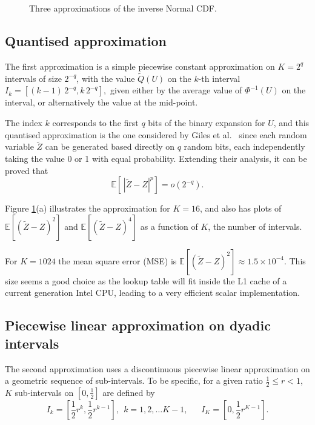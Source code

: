 \documentclass[11pt]{article}
\def \EE {{\mathbb{E}}}
\def \tQ {{\widetilde{Q}}}
\def \tZ {{\widetilde{Z}}}
\newcommand{\fracs}[2]{{\textstyle \frac{#1}{#2}}}
\begin{document}
\begin{figure}
\begin{center}
 \\
 \\
\end{center}
\caption{Three approximations of the inverse Normal CDF.}
\label{fig:fig1}
\end{figure}

\subsection{Quantised approximation}

The first approximation is a simple piecewise constant approximation on
$K\!=\!2^q$ intervals of size $2^{-q}$, with the value $\tQ(U)$ on the
$k$-th interval
$\displaystyle
I_k = [(k{-}1)\, 2^{-q}, k\, 2^{-q}],
$
given either by the average value of $\Phi^{-1}(U)$ on the interval, or 
alternatively the value at the mid-point.

The index $k$ corresponds to the first $q$ bits of the binary expansion 
for $U$, and this quantised approximation is the one considered by 
Giles et al.~\cite{ghmr19,ghmr19b}
since each random variable $\tZ$ can be generated based directly on 
$q$ random bits, each independently taking the value 0 or 1 with equal 
probability.  Extending their analysis, it can be proved that
\[
\EE[\, |\tZ{-}Z|^p] = o(2^{-q} ).
\]

Figure \ref{fig:fig1}(a) illustrates the approximation for $K\!=\!16$, 
and also has plots of $\EE[(\tZ{-}Z)^2]$ and $\EE[(\tZ{-}Z)^4]$ 
as a function of $K$, the number of intervals.

For $K\!=\!1024$ the mean square error (MSE) is
$\EE[(\tZ{-}Z)^2] \!\approx\! 1.5\!\times\! 10^{-4}$.
This size seems a good choice as the lookup table will fit inside the L1 
cache of a current generation Intel CPU, leading to a very efficient scalar 
implementation.

\subsection{Piecewise linear approximation on dyadic intervals}

The second approximation uses a discontinuous piecewise linear approximation
on a geometric sequence of sub-intervals.  To be specific, for a given ratio 
$\fracs{1}{2}\leq r < 1$, $K$ sub-intervals on $[0,\fracs{1}{2}]$ are defined by
\[
I_k = [\fracs{1}{2} r^{k},\fracs{1}{2} r^{k-1}], ~~ k = 1, 2, \ldots K{-}1,  ~~~~~~~
I_K = [0, \fracs{1}{2} r^{K-1}].
\]
\end{document}
